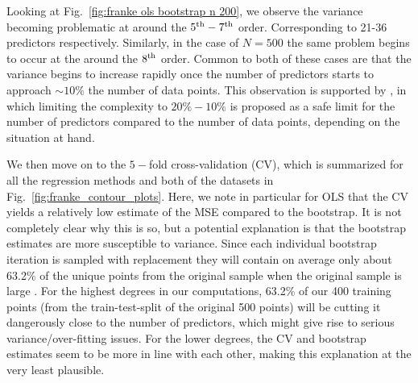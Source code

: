 \documentclass[reprint, english, nofootinbib]{revtex4-2}
\begin{document}
Looking at Fig.~\ref{fig:franke ols bootstrap n 200}, we observe the variance becoming problematic at around the $5^{\textup{th}}-7^{\textup{th}}$ order. Corresponding to 21-36 predictors respectively. Similarly, in the case of $N=500$ the same problem begins to occur at the around the $8^{\textup{th}}$ order. Common to both of these cases are that the variance begins to increase rapidly once the number of predictors starts to approach $\sim 10\%$ the number of data points. This observation is supported by \textcite{Harell}, in which limiting the complexity to $20\%-10\%$ is proposed as a safe limit for the number of predictors compared to the number of data points, depending on the situation at hand.

We then move on to the $5-$fold cross-validation (CV), which is summarized for all the regression methods and both of the datasets in Fig.~\ref{fig:franke_contour_plots}.
Here, we note in particular for OLS that the CV yields a relatively low estimate of the MSE compared to the bootstrap. It is not completely clear why this is so, but a potential explanation is that the bootstrap estimates are more susceptible to variance. Since each individual bootstrap iteration is sampled with replacement they will contain on average only about 63.2\% of the unique points from the original sample when the original sample is large \cite{hastie}. For the highest degrees in our computations, 63.2\% of our 400 training points (from the train-test-split of the original 500 points)  will be cutting it dangerously close to the number of predictors, which might give rise to serious variance/over-fitting issues. For the lower degrees, the CV and bootstrap estimates seem to be more in line with each other, making this explanation at the very least plausible.
\end{document}
